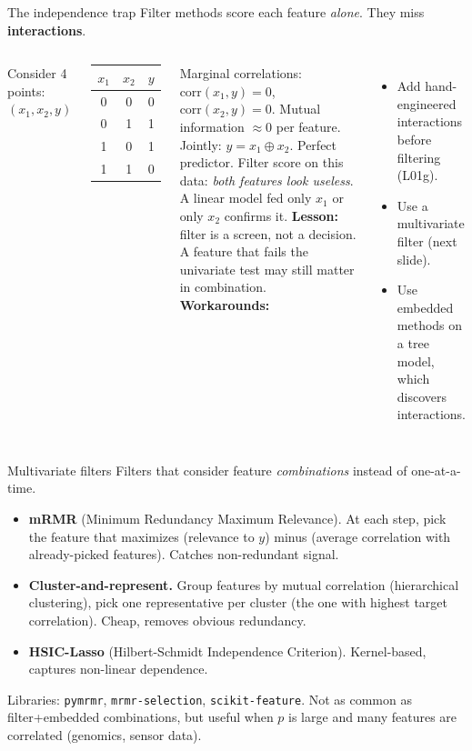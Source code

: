 \documentclass[aspectratio=169]{beamer}
\begin{document}
\begin{frame}{The independence trap}
  Filter methods score each feature \emph{alone}. They miss \textbf{interactions}.
  \vfill
  \begin{columns}[T]
    \footnotesize
    Consider 4 points: $(x_1, x_2, y)$
    \vskip 2pt
    \begin{center}\scriptsize
      \begin{tabular}{ccc}
        $x_1$ & $x_2$ & $y$ \\ \hline
        0 & 0 & 0 \\
        0 & 1 & 1 \\
        1 & 0 & 1 \\
        1 & 1 & 0
      \end{tabular}
    \end{center}
    \vskip 4pt
    Marginal correlations: $\text{corr}(x_1, y) = 0$, $\text{corr}(x_2, y) = 0$. Mutual information $\approx 0$ per feature.
    \vskip 4pt
    Jointly: $y = x_1 \oplus x_2$. Perfect predictor.
    Filter score on this data: \emph{both features look useless}. A linear model fed only $x_1$ or only $x_2$ confirms it.
    \vfill
    \textbf{Lesson:} filter is a screen, not a decision. A feature that fails the univariate test may still matter in combination.
    \vfill
    \textbf{Workarounds:}
    \begin{itemize}\small
      \item Add hand-engineered interactions before filtering (L01g).
      \item Use a multivariate filter (next slide).
      \item Use embedded methods on a tree model, which discovers interactions.
    \end{itemize}
  \end{columns}
\end{frame}

\begin{frame}{Multivariate filters}
  Filters that consider feature \emph{combinations} instead of one-at-a-time.
  \vfill
  \begin{itemize}
    \item \textbf{mRMR} (Minimum Redundancy Maximum Relevance). At each step, pick the feature that maximizes (relevance to $y$) minus (average correlation with already-picked features). Catches non-redundant signal.
    \item \textbf{Cluster-and-represent.} Group features by mutual correlation (hierarchical clustering), pick one representative per cluster (the one with highest target correlation). Cheap, removes obvious redundancy.
    \item \textbf{HSIC-Lasso} (Hilbert-Schmidt Independence Criterion). Kernel-based, captures non-linear dependence.
  \end{itemize}
  \vfill
  \footnotesize Libraries: \texttt{pymrmr}, \texttt{mrmr-selection}, \texttt{scikit-feature}. Not as common as filter+embedded combinations, but useful when $p$ is large and many features are correlated (genomics, sensor data).
\end{frame}
\end{document}
